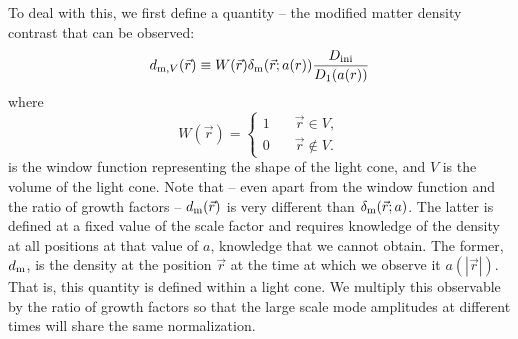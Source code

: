 \documentclass[prd,amsmath,amssymb,floatfix,superscriptaddress,nofootinbib,twocolumn]{revtex4-1}
\def\be{\begin{equation}}
\def\ee{\end{equation}}
\newcommand{\ini}{\rm ini}
\newcommand{\vrr}{\vec{r}}
\newcommand{\vs}{\nonumber\\}
\newcommand{\eql}[1]{\label{eq:#1}}
\begin{document}
\newcommand\dm{\delta_{\rm m}}
\newcommand\dlc{d_{\rm m}}
\newcommand\dmi{\delta_{\rm m,ini}}
\newcommand\dlch{d^{\rm h}_{\rm m}}
\newcommand\dolc{d^{ (1)}_{\rm m}}
\newcommand\dtlc{d^{ (2)}_{\rm m}}
To deal with this, we first define a quantity -- the modified matter density contrast that can be observed: 
\be
d_{{\rm m}, V}(\vrr) \equiv  W(\vec{r})\dm(\vrr;a(r)) \frac{D_{\ini}}{D_{1}(a(r))} \eql{LC} \vs
\ee
where
\be
W(\vec{r})=\begin{cases}
1 & \quad \vec{r} \in V, \\
0 & \quad \vec{r} \notin V.
\end{cases}
\ee
is the window function representing the shape of the light cone, and $V$ is the volume of the light cone. Note that -- even apart from the window function and the ratio of growth factors -- $\dlc(\vrr)$ is very different than $\dm(\vrr; a)$. The latter is defined at a fixed value of the scale factor and requires knowledge of the density at all positions at that value of $a$, knowledge that we cannot obtain. The former, $\dlc$, is the density at the position $\vrr$ at the time at which we observe it $a(|\vrr|)$. That is, this quantity is defined within a light cone.
%
We multiply this observable by the ratio of growth factors so that the large scale mode amplitudes at different times will share the same normalization. 
\end{document}
